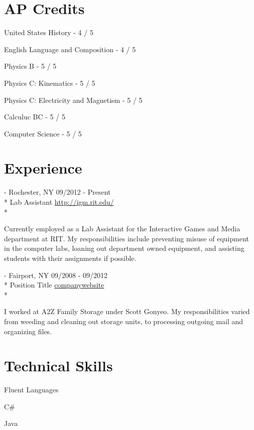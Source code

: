 \documentclass[a4paper,margin,line]{resume}
\newcommand{\rurl}[1]{\hfill {\footnotesize \url{#1}}}
\newcommand{\rdate}[1]{\hfill {\small #1}}
\renewcommand{\employer}[5]{\item[#1] - #2 \rdate{#3} \\* #4 \rurl{#5} \\*}
\begin{document}
\begin{resume}
\section{\mysidestyle AP Credits}
        \begin{compactitem}
                \item United States History - {\small 4 / 5}
                \item English Language and Composition - {\small 4 / 5}
                \item Physics B - {\small 5 / 5}
                \item Physics C: Kinematics - {\small 5 / 5}
                \item Physics C: Electricity and Magnetism - {\small 5 / 5}
                \item Calculuc BC - {\small 5 / 5}
                \item Computer Science - {\small 5 / 5}
        \end{compactitem}
\section{\mysidestyle Experience}
	\begin{asparadesc}
		\employer{Interactive Games and Media at RIT}{Rochester, NY}{09/2012 - Present}{Lab Assistant}{http://igm.rit.edu/}

		\small
		Currently employed as a Lab Assistant for the Interactive Games and Media department at RIT. My responsibilities include preventing misuse of equipment in the computer labs, loaning out department owned equipment, and assisting students with their assignments if possible.
		\normalsize
		\\
		\employer{Compass Properties}{Fairport, NY}{09/2008 - 09/2012}{Position Title}{companywebsite}

                \small
                I worked at A2Z Family Storage under Scott Gonyeo. My responsibilities varied from weeding and cleaning out storage units, to processing outgoing mail and organizing files.
    		\normalsize

\section{\mysidestyle Technical Skills}
	\begin{compactdesc}
		\item[Fluent Languages] \begin{inparaenum} { \small
			\item C\#
			\item Java
		} \end{inparaenum}
	\end{compactdesc}


\end{asparadesc}
\end{resume}
\end{document}
